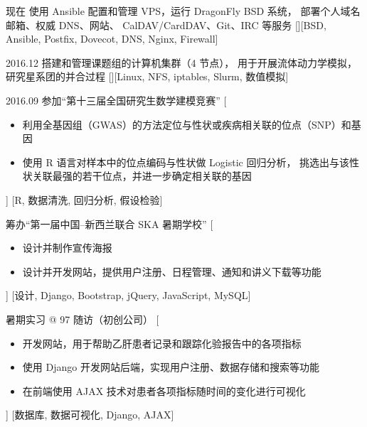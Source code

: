 \documentclass[zh]{resume}
\begin{document}
\begin{experiences}
  \separator{0.5em}
  \experience
    {现在 }%
    {使用 Ansible 配置和管理 VPS，运行 DragonFly BSD 系统，
      部署个人域名邮箱、权威 DNS、网站、 CalDAV/CardDAV、Git、IRC 等服务}%
    [][BSD, Ansible, Postfix, Dovecot, DNS, Nginx, Firewall]

  \separator{0.5em}
  \experience
    {2016.12}%
    {搭建和管理课题组的计算机集群（4 节点），
      用于开展流体动力学模拟，研究星系团的并合过程}%
    [][Linux, NFS, iptables, Slurm, 数值模拟]


  \separator{0.5em}
  \experience
    {2016.09}%
    {参加\enquote{第十三届全国研究生数学建模竞赛}}%
    [\begin{itemize}
      \item 利用全基因组（GWAS）的方法定位与性状或疾病相关联的位点（SNP）和基因
      \item 使用 R 语言对样本中的位点编码与性状做 Logistic 回归分析，
            挑选出与该性状关联最强的若干位点，并进一步确定相关联的基因
    \end{itemize}]%
    [R, 数据清洗, 回归分析, 假设检验]

  \separator{0.5em}
    {筹办\enquote{第一届中国--新西兰联合 SKA 暑期学校}}%
    [\begin{itemize}
      \item 设计并制作宣传海报
      \item 设计并开发网站，提供用户注册、日程管理、通知和讲义下载等功能
    \end{itemize}]%
    [设计, Django, Bootstrap, jQuery, JavaScript, MySQL]

  \separator{0.5em}
    {暑期实习 @ 97 随访（初创公司）}%
    [\begin{itemize}
      \item 开发网站，用于帮助乙肝患者记录和跟踪化验报告中的各项指标
      \item 使用 Django 开发网站后端，实现用户注册、数据存储和搜索等功能
      \item 在前端使用 AJAX 技术对患者各项指标随时间的变化进行可视化
    \end{itemize}]%
    [数据库, 数据可视化, Django, AJAX]

\end{experiences}
\end{document}
